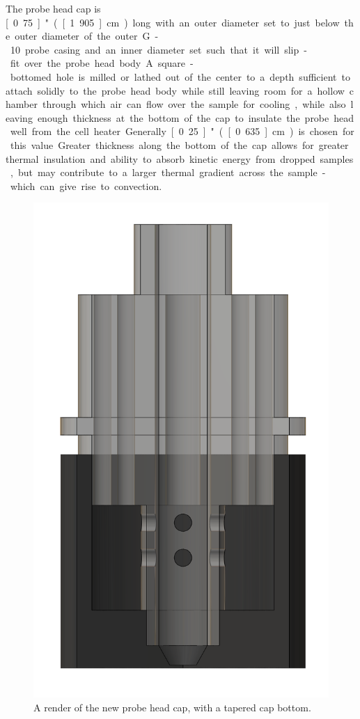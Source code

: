 \documentclass[PaulGanssle-Thesis.tex]{subfiles}
\begin{document}
The probe head cap is \unit[0.75]{"} (\unit[1.905]{cm}) long with an outer diameter set to just below the outer diameter of the outer G-10 probe casing and an inner diameter set such that it will slip-fit over the probe head body. A square-bottomed hole is milled or lathed out of the center to a depth sufficient to attach solidly to the probe head body while still leaving room for a hollow chamber through which air can flow over the sample for cooling, while also leaving enough thickness at the bottom of the cap to insulate the probe head well from the cell heater. Generally \unit[0.25]{"} (\unit[0.635]{cm}) is chosen for this value. Greater thickness along the bottom of the cap allows for greater thermal insulation and ability to absorb kinetic energy from dropped samples, but may contribute to a larger thermal gradient across the sample - which can give rise to convection. 

\begin{figure}
\vspace*{-0.5\lineheight}
\includegraphics[width=0.25\tw]{figures/magnetometer/ProbeCap.png}
\caption{A render of the new probe head cap, with a tapered cap bottom.}
\label{fig:ProbeCapRender}
\vspace*{-0.5\lineheight}
\end{figure}
\end{document}
